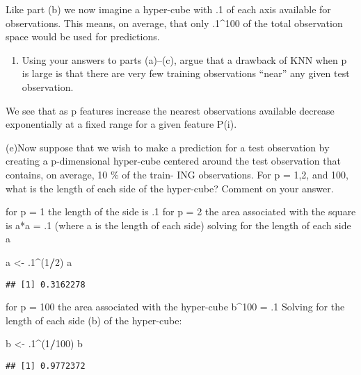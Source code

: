 \documentclass[]{article}
\newenvironment{Shaded}{\begin{snugshade}}{\end{snugshade}}
\newcommand{\DecValTok}[1]{\textcolor[rgb]{0.00,0.00,0.81}{#1}}
\newcommand{\FloatTok}[1]{\textcolor[rgb]{0.00,0.00,0.81}{#1}}
\newcommand{\NormalTok}[1]{#1}
\newcommand{\OperatorTok}[1]{\textcolor[rgb]{0.81,0.36,0.00}{\textbf{#1}}}
\newcommand{\StringTok}[1]{\textcolor[rgb]{0.31,0.60,0.02}{#1}}
\providecommand{\tightlist}{%
  \setlength{\itemsep}{0pt}\setlength{\parskip}{0pt}}
\begin{document}
Like part (b) we now imagine a hyper-cube with .1 of each axis available
for observations. This means, on average, that only .1\^{}100 of the
total observation space would be used for predictions.

\begin{enumerate}
\def\labelenumi{(\alph{enumi})}
\setcounter{enumi}{3}
\tightlist
\item
  Using your answers to parts (a)--(c), argue that a drawback of KNN
  when p is large is that there are very few training observations
  ``near'' any given test observation.
\end{enumerate}

We see that as p features increase the nearest observations available
decrease exponentially at a fixed range for a given feature P(i).

(e)Now suppose that we wish to make a prediction for a test observation
by creating a p-dimensional hyper-cube centered around the test
observation that contains, on average, 10 \% of the train- ING
observations. For p = 1,2, and 100, what is the length of each side of
the hyper-cube? Comment on your answer.

for p = 1 the length of the side is .1 for p = 2 the area associated
with the square is a*a = .1 (where a is the length of each side) solving
for the length of each side a

\begin{Shaded}
\begin{Highlighting}[]
\NormalTok{a <-}\StringTok{ }\FloatTok{.1}\OperatorTok{^}\NormalTok{(}\DecValTok{1}\OperatorTok{/}\DecValTok{2}\NormalTok{)}
\NormalTok{a}
\end{Highlighting}
\end{Shaded}

\begin{verbatim}
## [1] 0.3162278
\end{verbatim}

for p = 100 the area associated with the hyper-cube b\^{}100 = .1
Solving for the length of each side (b) of the hyper-cube:

\begin{Shaded}
\begin{Highlighting}[]
\NormalTok{b <-}\StringTok{ }\FloatTok{.1}\OperatorTok{^}\NormalTok{(}\DecValTok{1}\OperatorTok{/}\DecValTok{100}\NormalTok{)}
\NormalTok{b}
\end{Highlighting}
\end{Shaded}

\begin{verbatim}
## [1] 0.9772372
\end{verbatim}
\end{document}
